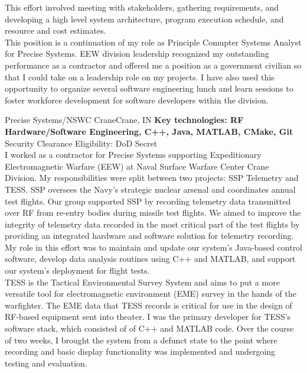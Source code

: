 \documentclass[11pt,a4paper,sans]{moderncv}        %
\newcommand{\techlist}[1]{\textbf{Key technologies: {#1}}\\}
\begin{document}
{This effort involved meeting with stakeholders, gathering requirements, and developing a high level system architecture, program execution schedule, and resource and cost estimates.
\\ \hspace*{1em}
This position is a continuation of my role as Principle Comupter Systems Analyst for Precise Systems.
EEW division leadership recognized my outstanding performance as a contractor and offered me a position as a government civilian so that I could take on a leadership role on my projects.
I have also used this opportunity to organize several software engineering lunch and learn sessions to foster workforce development for software developers within the division.
}

{}
{Precise Systems/NSWC Crane}{Crane, IN}{
\techlist{RF Hardware/Software Engineering, C++, Java, MATLAB, CMake, Git}
Security Clearance Eligibility: DoD Secret
\\ \hspace*{1em}
I worked as a contractor for Precise Systems supporting Expeditionary Electromagnetic Warfare (EEW) at Naval Surface Warfare Center Crane Division.
My responsibilities were split between two projects: SSP Telemetry and TESS.
SSP oversees the Navy's strategic nuclear arsenal and coordinates annual test flights.
Our group supported SSP by recording telemetry data transmitted over RF from re-entry bodies during missile test flights.
We aimed to improve the integrity of telemetry data recorded in the most critical part of the test flights by providing an integrated hardware and software solution for telemetry recording.
My role in this effort was to maintain and update our system's Java-based control software, develop data analysis routines using C++ and MATLAB, and support our system's deployment for flight tests.
\\ \hspace*{1em}
TESS is the Tactical Environmental Survey System and aims to put a more versatile tool for electromagnetic environment (EME) survey in the hands of the warfighter.
The EME data that TESS records is critical for use in the design of RF-based equipment sent into theater.
I was the primary developer for TESS's software stack, which consisted of of C++ and MATLAB code.
Over the course of two weeks, I brought the system from a defunct state to the point where recording and basic display functionality was implemented and undergoing testing and evaluation.
}%
\end{document}
